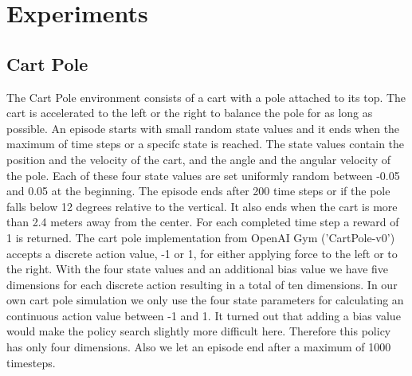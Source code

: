 \chapter{Experiments}
\label{chap:4}


\section{Cart Pole}



The Cart Pole environment consists of a cart with a pole attached to its top. The cart is accelerated to the left or the right to balance the pole for as long as possible. An episode starts with small random state values and it ends when the maximum of time steps or a specifc state is reached. The state values contain the position and the velocity of the cart, and the angle and the angular velocity of the pole. Each of these four state values are set uniformly random between -0.05 and 0.05 at the beginning. The episode ends after 200 time steps or if the pole falls below 12 degrees relative to the vertical. It also ends when the cart is more than 2.4 meters away from the center. For each completed time step a reward of 1 is returned. The cart pole implementation from OpenAI Gym ('CartPole-v0') accepts a discrete action value, -1 or 1, for either applying force to the left or to the right. With the four state values and an additional bias value we have five dimensions for each discrete action resulting in a total of ten dimensions. In our own cart pole simulation we only use the four state parameters for calculating an continuous action value between -1 and 1. It turned out that adding a bias value would make the policy search slightly more difficult here. Therefore this policy has only four dimensions. Also we let an episode end after a maximum of 1000 timesteps.


